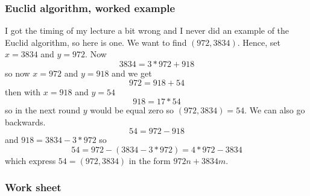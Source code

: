 \documentclass[12pt]{article}
\begin{document}
\subsubsection*{Euclid algorithm, worked example}
I got the timing of my lecture a bit wrong and I never did an example
of the Euclid algorithm, so here is one. We want to find $(972,3834)$. Hence, set $x=3834$ and $y=972$. Now
\begin{equation}
3834 = 3*972 +918
\end{equation}
so now $x=972$ and $y=918$ and we get
\begin{equation}
972=918+54
\end{equation}
then with $x=918$ and $y=54$
\begin{equation}
918=17*54
\end{equation}
so in the next round $y$ would be equal zero so $(972,3834)=54$. We can also go backwards. 
\begin{equation}
54=972-918
\end{equation}
and $918=3834-3*972$ so
\begin{equation}
54=972-(3834-3*972)=4*972-3834
\end{equation}
which express $54=(972,3834)$ in the form $972n+3834m$.


\subsubsection*{Work sheet}
\end{document}
